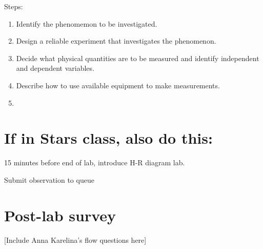  
 
 

Steps:
\begin{enumerate}
 \item Identify the phenomemon to be investigated.
 
 \item Design a reliable experiment that investigates the phenomenon.
 
 \item Decide what physical quantities are to be measured and identify independent and dependent variables.
 
 \item Describe how to use available equipment to make measurements.
 
 \item 
\end{enumerate}

\section{If in Stars class, also do this:}

15 minutes before end of lab, introduce H-R diagram lab.

Submit observation to queue

\section{Post-lab survey}

[Include Anna Karelina's flow questions here]